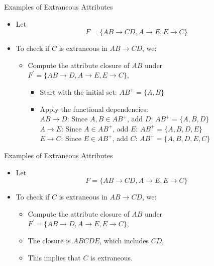 \documentclass{beamer}
\begin{document}
\begin{frame}{Examples of Extraneous Attributes}
    \begin{itemize}
        \item Let
            $$
                F = \{ AB \rightarrow CD, A \rightarrow E, E \rightarrow C \}
            $$
        \item To check if $C$ is extraneous in $AB \rightarrow CD$, we:
            \begin{itemize}
                \item Compute the attribute closure of $AB$ under $F^\prime = \{ AB \rightarrow D, A \rightarrow E, E \rightarrow C \}$,
                    \begin{itemize}
                        \item Start with the initial set: $AB^+ = \{ A, B \}$
                        \item Apply the functional dependencies: \\
                            \( AB \rightarrow D \): Since \( A, B \in AB^+ \), add \( D \): $AB^+ = \{ A, B, D \}$ \\
                            \( A \rightarrow E \): Since \( A \in AB^+ \), add \( E \): $AB^+ = \{ A, B, D, E \}$ \\
                            \( E \rightarrow C \): Since \( E \in AB^+ \), add \( C \): $AB^+ = \{ A, B, D, E, C \}$
                    \end{itemize}
            \end{itemize}
    \end{itemize}
\end{frame}

\begin{frame}{Examples of Extraneous Attributes}
    \begin{itemize}
        \item Let
            $$
                F = \{ AB \rightarrow CD, A \rightarrow E, E \rightarrow C \}
            $$
        \item To check if $C$ is extraneous in $AB \rightarrow CD$, we:
            \begin{itemize}
                \item Compute the attribute closure of $AB$ under $F^\prime = \{ AB \rightarrow D, A \rightarrow E, E \rightarrow C \}$,
                \item The closure is $ABCDE$, which includes $CD$,
                \item This implies that $C$ is extraneous.
            \end{itemize}
    \end{itemize}
\end{frame}
\end{document}
